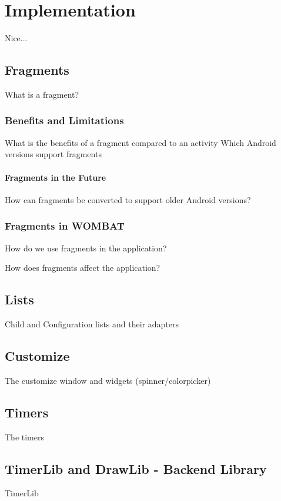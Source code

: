 \chapter{Implementation}
Nice...

\section{Fragments}

What is a fragment?

\subsection{Benefits and Limitations}
What is the benefits of a fragment compared to an activity
Which Android versions support fragments

\subsubsection*{Fragments in the Future}
How can fragments be converted to support older Android versions?

\subsection{Fragments in WOMBAT}
How do we use fragments in the application?

How does fragments affect the application?

\section{Lists}
Child and Configuration lists and their adapters

\section{Customize}
The customize window and widgets (spinner/colorpicker)

\section{Timers}
The timers

\section{TimerLib and DrawLib - Backend Library}
TimerLib